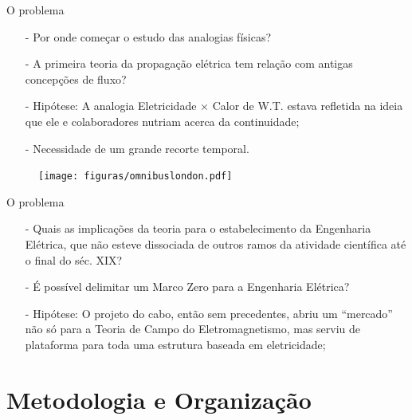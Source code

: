 \documentclass[aspectratio=169]{beamer}
\begin{document}
\begin{frame}{O problema}
\begin{minipage}{0.47\textwidth}
	\begin{itemize}
		\item[-] Por onde começar o estudo das analogias físicas?
		\item[-] A primeira teoria da propagação elétrica tem relação com antigas concepções de fluxo?
		\item[-] Hipótese: A analogia Eletricidade $\times$ Calor de W.T. estava refletida na ideia que ele e colaboradores nutriam acerca da continuidade; 
		\item[-] Necessidade de um grande recorte temporal.
	\end{itemize}
\end{minipage}
\begin{minipage}{0.5\textwidth}
	\begin{figure}
		\texttt{[image: figuras/omnibuslondon.pdf]}
	\end{figure}
\end{minipage}
\end{frame}

\begin{frame}{O problema}
\begin{itemize}
	\item[-] Quais as implicações da teoria para o estabelecimento da Engenharia Elétrica, que não esteve dissociada de outros ramos da atividade científica até o final do séc. XIX? 
	\item[-] É possível delimitar um Marco Zero para a Engenharia Elétrica?
	\item[-] Hipótese: O projeto do cabo, então sem precedentes, abriu um ``mercado'' não só para a Teoria de Campo do Eletromagnetismo, mas serviu de plataforma para toda uma estrutura baseada em eletricidade;
\end{itemize}
\end{frame}

\section{Metodologia e Organização}
\end{document}
